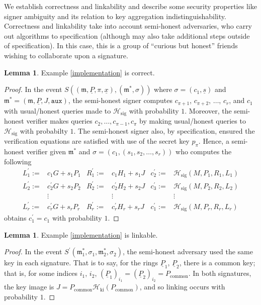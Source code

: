 \documentclass{mrl}
\theoremstyle{definition}
\numberwithin{theorem}{subsection}
\newtheorem{lemma}[theorem]{Lemma}
\begin{document}
We establish correctness and linkability and describe some security properties like signer ambiguity and its relation to key aggregation indistinguishability. Correctness and linkability take into account semi-honest adversaries, who carry out algorithms to specification (although may also take additional steps outside of specification). In this case, this is a group of ``curious but honest'' friends wishing to collaborate upon a signature.

\begin{lemma}\label{correctness}
Example \ref{implementation} is correct.
\end{lemma}
\begin{proof}

In the event $S((\mathfrak{m}, \underline{P}, \pi, \underline{x}), (\mathfrak{m}^*, \sigma))$ where $\sigma = (c_1, \underline{s})$ and $\mathfrak{m}^* = (\mathfrak{m}, \underline{P}, J, \texttt{aux})$, the semi-honest signer computes $c_{\pi+1}$, $c_{\pi+2}$, $\ldots$, $c_r$, and $c_1$ with usual/honest queries made to $\mathcal{H}_{\text{sig}}$ with probability $1$. Moreover, the semi-honest verifier makes queries $c_2, \ldots, c_{\pi-1}, c_\pi$ by making usual/honest queries to $\mathcal{H}_{\text{sig}}$ with probabilty $1$. The semi-honest signer also, by specification, ensured the verification equations are satisfied with use of the secret key $p_\pi$. Hence, a semi-honest verifier given $\mathfrak{m}^*$ and $\sigma = (c_1, (s_1, s_2, \ldots, s_r))$ who computes the following
\begin{align*}
L_1^\prime :=& c_1 G + s_1 P_1 & R_1^\prime :=& c_1 H_1 + s_1 J & c_2^\prime :=& \mathcal{H}_{\text{sig}}(M, P_1, R_1, L_1) \\
L_2^\prime :=& c_2^\prime G + s_2 P_2 & R_2^\prime :=& c_2^\prime H_2 + s_2 J & c_3^\prime :=& \mathcal{H}_{\text{sig}}(M, P_2, R_2, L_2) \\
 & \vdots & & \vdots & & \vdots \\
L_r^\prime :=& c_r^\prime G + s_r P_r & R_r^\prime :=& c_r^\prime H_r + s_r J & c_1^\prime :=& \mathcal{H}_{\text{sig}}(M, P_r, R_r, L_r)
\end{align*} obtains $c_1^\prime = c_1$ with probability $1$.
\end{proof}


\begin{lemma}
Example \ref{implementation} is linkable.
\end{lemma}
\begin{proof}
In the event $S^\prime(\mathfrak{m}_1^*, \sigma_1, \mathfrak{m}^*_2, \sigma_2)$, the semi-honest adversary used the same key in each signature. That is to say, for the rings $\underline{P}_1$, $\underline{P}_2$, there is a common key; that is, for some indices $i_1$, $i_2$, $(\underline{P}_1)_{i_1} = (\underline{P}_2)_{i_2} = P_{\text{common}}$. In both signatures, the key image is $J = P_{\text{common}}\mathcal{H}_{\text{ki}}(P_{\text{common}})$, and so linking occurs with probability $1$.
\end{proof}
\end{document}
